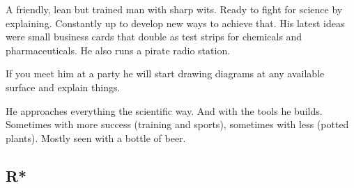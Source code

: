 \begin{npcBox}[title=N*]
    \begin{stressSection}
    \end{stressSection}
    \begin{tabularx}{\textwidth}{ XX }
    \end{tabularx}

    \begin{consequences}
    \item {}
    \item {}
    \item {}
    \end{consequences}

    \begin{npcDescription}
    A friendly, lean but trained man with sharp wits. Ready to fight for science by explaining. Constantly up to develop new ways to achieve that. His latest ideas were small business cards that double as test strips for chemicals and pharmaceuticals. He also runs a pirate radio station.

    If you meet him at a party he will start drawing diagrams at any available surface and explain things.

    He approaches everything the scientific way. And with the tools he builds. Sometimes with more success (training and sports), sometimes with less (potted plants).
    Mostly seen with a bottle of beer.

    \end{npcDescription}

\end{npcBox}

\subsection{R*}

